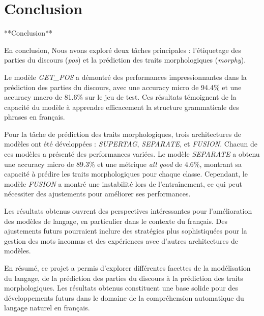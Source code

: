 \section{Conclusion}

**Conclusion**

En conclusion, Nous avons exploré deux tâches principales : l'étiquetage des parties du discours (\textit{pos}) et la prédiction des traits morphologiques (\textit{morphy}). 

Le modèle \textit{GET\_POS} a démontré des performances impressionnantes dans la prédiction des parties du discours, avec une accuracy micro de 94.4\% et une accuracy macro de 81.6\% sur le jeu de test. Ces résultats témoignent de la capacité du modèle à apprendre efficacement la structure grammaticale des phrases en français.

Pour la tâche de prédiction des traits morphologiques, trois architectures de modèles ont été développées : \textit{SUPERTAG}, \textit{SEPARATE}, et \textit{FUSION}. Chacun de ces modèles a présenté des performances variées. Le modèle \textit{SEPARATE} a obtenu une accuracy micro de 89.3\% et une métrique \textit{all good} de 4.6\%, montrant sa capacité à prédire les traits morphologiques pour chaque classe. Cependant, le modèle \textit{FUSION} a montré une instabilité lors de l'entraînement, ce qui peut nécessiter des ajustements pour améliorer ses performances.

Les résultats obtenus ouvrent des perspectives intéressantes pour l'amélioration des modèles de langage, en particulier dans le contexte du français. Des ajustements futurs pourraient inclure des stratégies plus sophistiquées pour la gestion des mots inconnus et des expériences avec d'autres architectures de modèles.

En résumé, ce projet a permis d'explorer différentes facettes de la modélisation du langage, de la prédiction des parties du discours à la prédiction des traits morphologiques. Les résultats obtenus constituent une base solide pour des développements futurs dans le domaine de la compréhension automatique du langage naturel en français.

